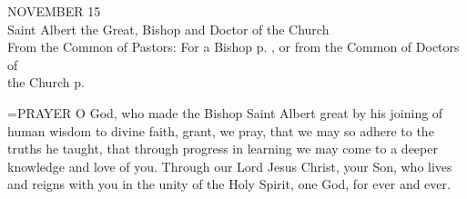 \begin{center}\normalsize NOVEMBER 15\\
\footnotesize Saint Albert the Great, Bishop and Doctor of the Church\\
\footnotesize From the Common of Pastors: For a Bishop p.   , or from the Common of Doctors of\\
\footnotesize the Church p. \\
\end{center}

\hangindent=\parindent \small{PRAYER 
O God, who made the Bishop Saint Albert great
by his joining of human wisdom to divine faith,
grant, we pray, that we may so adhere to the truths he taught,
that through progress in learning
we may come to a deeper knowledge and love of you.
Through our Lord Jesus Christ, your Son,
who lives and reigns with you in the unity of the Holy Spirit,
one God, for ever and ever.\\}
 
